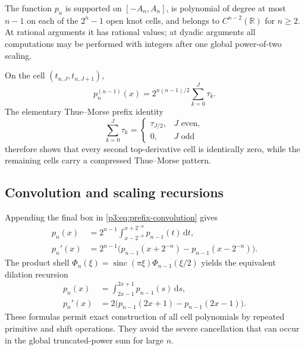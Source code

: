 \documentclass[11pt,oneside]{article}
\numberwithin{equation}{section}
\theoremstyle{definition}
\theoremstyle{remark}
\newcommand{\R}{\mathbb R}
\newcommand{\sinc}{\operatorname{sinc}}
\newcommand{\dd}{\,\mathrm d}
\begin{document}
\begin{corollary}
\label{p3:cor:piecewise-arithmetic}
The function $p_n$ is supported on $[-A_n,A_n]$, is polynomial of degree at most
$n-1$ on each of the $2^n-1$ open knot cells, and belongs to $C^{n-2}(\R)$ for
$n\ge2$.  At rational arguments it has rational values; at dyadic arguments all
computations may be performed with integers after one global power-of-two scaling.
\end{corollary}

On the cell $(t_{n,J},t_{n,J+1})$,
\begin{equation}
 p_n^{(n-1)}(x)=2^{n(n-1)/2}\sum_{k=0}^{J}\tau_k.
 \label{p3:eq:top-cell-value}
\end{equation}
The elementary Thue--Morse prefix identity
\begin{equation}
 \sum_{k=0}^{J}\tau_k=
 \begin{cases}
   \tau_{J/2},&J\text{ even},\\
   0,&J\text{ odd}
 \end{cases}
 \label{p3:eq:tm-prefix}
\end{equation}
therefore shows that every second top-derivative cell is identically zero, while the
remaining cells carry a compressed Thue--Morse pattern.

\subsection{Convolution and scaling recursions}

Appending the final box in \cref{p3:eq:prefix-convolution} gives
\begin{align}
 p_n(x)
 &=2^{n-1}\int_{x-2^{-n}}^{x+2^{-n}}p_{n-1}(t)\dd t,
 \label{p3:eq:last-box-recursion}\\
 p_n'(x)
 &=2^{n-1}\bigl(p_{n-1}(x+2^{-n})-p_{n-1}(x-2^{-n})\bigr).
 \label{p3:eq:last-box-derivative}
\end{align}
The product shell
$\Phi_n(\xi)=\sinc(\pi\xi)\Phi_{n-1}(\xi/2)$ yields the equivalent dilation recursion
\begin{align}
 p_n(x)&=\int_{2x-1}^{2x+1}p_{n-1}(s)\dd s,
 \label{p3:eq:scale-recursion}\\
 p_n'(x)&=2\bigl(p_{n-1}(2x+1)-p_{n-1}(2x-1)\bigr).
 \label{p3:eq:scale-derivative}
\end{align}
These formulas permit exact construction of all cell polynomials by repeated primitive
and shift operations.  They avoid the severe cancellation that can occur in the global
truncated-power sum for large $n$.
\end{document}
